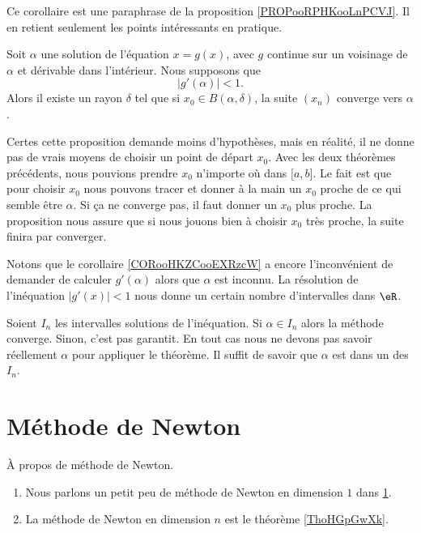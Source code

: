 Ce corollaire est une paraphrase de la proposition \ref{PROPooRPHKooLnPCVJ}. Il en retient seulement les points intéressants en pratique.

\begin{corollary}     \label{CORooHKZCooEXRzcW}
    Soit \( \alpha\) une solution de l'équation \( x=g(x)\), avec \( g\) continue sur un voisinage de \( \alpha\) et dérivable dans l'intérieur. Nous supposons que
    \begin{equation}
        | g'(\alpha) |<1.
    \end{equation}
    Alors il existe un rayon \( \delta\) tel que si \( x_0\in B(\alpha,\delta)\), la suite \( (x_n)\) converge vers \( \alpha\).
\end{corollary}
 
Certes cette proposition demande moins d'hypothèses, mais en réalité, il ne donne pas de vrais moyens de choisir un point de départ \( x_0\). Avec les deux théorèmes précédents, nous pouvions prendre \( x_0\) n'importe où dans \( \mathopen[ a , b \mathclose]\). Le fait est que pour choisir \( x_0\) nous pouvons tracer et donner à la main un \( x_0\) proche de ce qui semble être \( \alpha\). Si ça ne converge pas, il faut donner un \(x_0\) plus proche. La proposition nous assure que si nous jouons bien à choisir \( x_0\) très proche, la suite finira par converger.

Notons que le corollaire \ref{CORooHKZCooEXRzcW} a encore l'inconvénient de demander de calculer \( g'(\alpha)\) alors que \( \alpha\) est inconnu. La résolution de l'inéquation \( | g'(x) |<1\) nous donne un certain nombre d'intervalles dans \( \eR\). 

Soient \( I_n\) les intervalles solutions de l'inéquation.  Si \( \alpha\in I_n\) alors la méthode converge. Sinon, c'est pas garantit. En tout cas nous ne devons pas savoir réellement \( \alpha\) pour appliquer le théorème. Il suffit de savoir que \( \alpha\) est dans un des \( I_n\).

\section{Méthode de Newton}
\label{SECooIKXNooACLljs}

\begin{InternalLinks}
    À propos de méthode de Newton.
    \begin{enumerate}
        \item
            Nous parlons un petit peu de méthode de Newton en dimension \( 1\) dans \ref{SECooIKXNooACLljs}.
        \item
           La méthode de Newton en dimension $n$ est le théorème \ref{ThoHGpGwXk}.
    \end{enumerate}
\end{InternalLinks}

